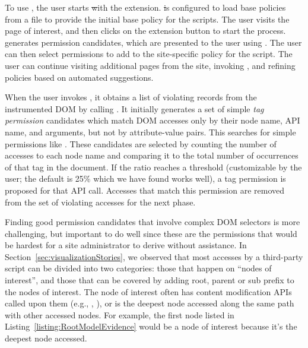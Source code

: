 To use \pg, the user starts \st with the \pg extension.  \st is
configured to load base policies from a file to provide the initial base
policy for the scripts.  The user visits the page of interest, and then
clicks on the \pg extension button to start the process.  \pg generates
permission candidates, which are presented to the user using \vis.  The
user can then select permissions to add to the site-specific policy for
the script.  The user can continue visiting additional pages from the
site, invoking \pg, and refining policies based on automated
suggestions.

When the user invokes \pg, it obtains a list of violating records from
the instrumented DOM by calling .  It
initially generates a set of simple \emph{tag permission} candidates
which match DOM accesses only by their node name, API name, and
arguments, but not by attribute-value pairs.  This searches for simple
permissions like .  These candidates are selected by
counting the number of accesses to each node name and comparing it to
the total number of occurrences of that tag in the document.  If the
ratio reaches a threshold (customizable by the user; the default is 25\%
which we have found works well), a tag permission is proposed for that
API call.  Accesses that match this permission are removed from the set
of violating accesses for the next phase.

Finding good permission candidates that involve complex DOM selectors
is more challenging, but important to do well since these are the
permissions that would be hardest for a site administrator to derive
without assistance.  In Section~\ref{sec:visualizationStories}, we
observed that most accesses by a third-party script can be divided into
two categories: those that happen on ``nodes of interest'', and those
that can be covered by adding root, parent or sub prefix to the nodes of
interest.  The node of interest often has content modification APIs
called upon them (e.g., , ), or is
the deepest node accessed along the same path with other accessed nodes.
For example, the first node listed in
Listing~\ref{listing:RootModelEvidence} would be a node of interest
because it's the deepest node accessed.  

